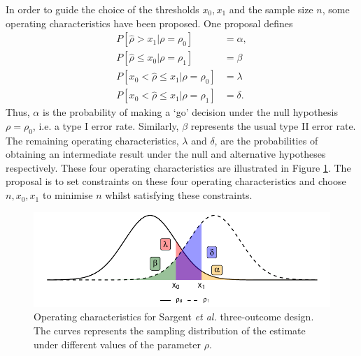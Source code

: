 \documentclass[sagev]{sagej} %
\begin{document}
In order to guide the choice of the thresholds $x_0, x_1$ and the sample size $n$, some operating characteristics have been proposed. One proposal \cite{Sargent2001} defines 
\begin{equation}
\begin{aligned}
P[ \hat{\rho} > x_1 | \rho = \rho_0] & = \alpha, \\
P[ \hat{\rho} \leq x_0 | \rho = \rho_1] & = \beta \\
P[ x_0 < \hat{\rho} \leq x_1 | \rho = \rho_0] & = \lambda \\
P[ x_0 < \hat{\rho} \leq x_1 | \rho = \rho_1] & = \delta.
\end{aligned}
\end{equation}\label{eqn:Sarg_ocs}
Thus, $\alpha$ is the probability of making a `go' decision under the null hypothesis $\rho = \rho_0$, i.e. a type I error rate. Similarly, $\beta$ represents the usual type II error rate. The remaining operating characteristics, $\lambda$ and $\delta$, are the probabilities of obtaining an intermediate result under the null and alternative hypotheses respectively. These four operating characteristics are illustrated in Figure \ref{fig:Sarg_ocs}. The proposal is to set constraints on these four operating characteristics and choose $n, x_0, x_1$ to minimise $n$ whilst satisfying these constraints. 

\begin{figure}
\centering
\includegraphics[scale=0.8]{./figures/Sarg_ocs}
\caption{Operating characteristics for Sargent \emph{et al.} \cite{Sargent2001} three-outcome design. The curves represents the sampling distribution of the estimate under different values of the parameter $\rho$.}
\label{fig:Sarg_ocs}
\end{figure}
\end{document}
